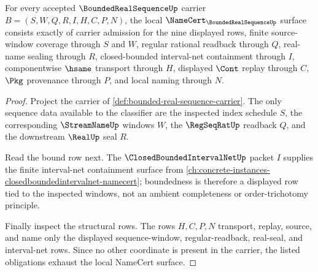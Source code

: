 \begin{theorem}
\label{thm:bounded-real-sequence-namecert-obligations}
For every accepted $\BoundedRealSequenceUp$ carrier $B=(S,W,Q,R,I,H,C,P,N)$, the local $\NameCert_{\BoundedRealSequenceUp}$ surface consists exactly of carrier admission for the nine displayed rows, finite source-window coverage through $S$ and $W$, regular rational readback through $Q$, real-name sealing through $R$, closed-bounded interval-net containment through $I$, componentwise $\hsame$ transport through $H$, displayed $\Cont$ replay through $C$, $\Pkg$ provenance through $P$, and local naming through $N$.
\end{theorem}
\begin{proof}
Project the carrier of \autoref{def:bounded-real-sequence-carrier}. The only sequence data available to the classifier are the inspected index schedule $S$, the corresponding $\StreamNameUp$ windows $W$, the $\RegSeqRatUp$ readback $Q$, and the downstream $\RealUp$ seal $R$.

Read the bound row next. The $\ClosedBoundedIntervalNetUp$ packet $I$ supplies the finite interval-net containment surface from \autoref{ch:concrete-instances-closedboundedintervalnet-namecert}; boundedness is therefore a displayed row tied to the inspected windows, not an ambient completeness or order-trichotomy principle.

Finally inspect the structural rows. The rows $H,C,P,N$ transport, replay, source, and name only the displayed sequence-window, regular-readback, real-seal, and interval-net rows. Since no other coordinate is present in the carrier, the listed obligations exhaust the local NameCert surface.
\end{proof}

